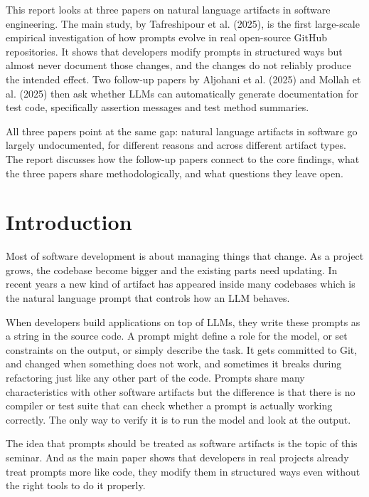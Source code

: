\documentclass[
    pdftex,
    final,
    11pt,
    a4paper,
    parskip=false,
    oneside,
    footheight=0mm,
    footinclude=false,
    toc=bibliography
]{scrbook}
\begin{document}
This report looks at three papers on natural language artifacts in software engineering. The main study, by Tafreshipour et al. (2025), is the first large-scale empirical investigation of how prompts evolve in real open-source GitHub repositories. It shows that developers modify prompts in structured ways but almost never document those changes, and the changes do not reliably produce the intended effect. Two follow-up papers by Aljohani et al. (2025) and Mollah et al. (2025) then ask whether LLMs can automatically generate documentation for test code, specifically assertion messages and test method summaries.

All three papers point at the same gap: natural language artifacts in software go largely undocumented, for different reasons and across different artifact types. The report discusses how the follow-up papers connect to the core findings, what the three papers share methodologically, and what questions they leave open.

\tableofcontents

\clearpage

\mainmatter

\chapter{Introduction}
\label{ch:introduction}

Most of software development is about managing things that change. As a project grows, the codebase become bigger and the existing parts need updating. In recent years a new kind of artifact has appeared inside many codebases which is the natural language prompt that controls how an LLM behaves.

When developers build applications on top of LLMs, they write these prompts as a string in the source code. A prompt might define a role for the model, or set constraints on the output, or simply describe the task. It gets committed to Git, and changed when something does not work, and sometimes it breaks during refactoring just like any other part of the code. Prompts share many characteristics with other software artifacts but the difference is that there is no compiler or test suite that can check whether a prompt is actually working correctly. The only way to verify it is to run the model and look at the output.

The idea that prompts should be treated as software artifacts is the topic of this seminar. And as the main paper shows that developers in real projects already treat prompts more like code, they modify them in structured ways even without the right tools to do it properly.
\end{document}
